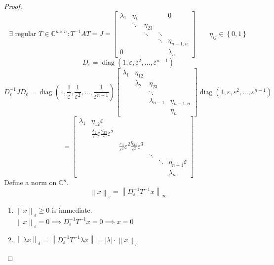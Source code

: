 \documentclass{article}
\numberwithin{lecref}{section}
\newcommand{\set}[1]{\left\{#1\right\}}
\newcommand{\norm}[1]{\left\|#1\right\|}
\newcommand{\card}[1]{\left|#1\right|}
\begin{document}
\begin{proof}
  \[ \exists \text{ regular } T \in \mathbb C^{n \times n}: T^{-1} AT = J = \begin{bmatrix} \lambda_1 & \eta_k & & & 0 \\ & \ddots & \eta_{23} & & \\ & & \ddots & \ddots & \\ & & & \ddots & \eta_{n-1,n} \\ 0 & & & & \lambda_n \end{bmatrix} \qquad \eta_{ij} \in \set{0,1} \]
  \[ D_{\varepsilon} = \operatorname{diag}(1, \varepsilon, \varepsilon^2, \dots, \varepsilon^{n-1}) \]
  \[
    D_{\varepsilon}^{-1} J D_{\varepsilon}
      = \operatorname{diag}(1, \frac1\varepsilon, \frac1{\varepsilon^2}, \dots, \frac{1}{\varepsilon^{n-1}})
      \begin{bmatrix} \lambda_1 & \eta_{12} & & \\ & \lambda_2 & \eta_{23} & \\ & & \ddots & \\ & & \lambda_{n-1} & \eta_{n-1,n} \\ & & & \eta_{n} \end{bmatrix}
      \operatorname{diag}(1, \varepsilon, \varepsilon^2, \dots, \varepsilon^{n-1})
  \] \[
      = \begin{bmatrix}
        \lambda_1 & \eta_{12} \varepsilon & & & & \\
          & \frac{\lambda_2}{\varepsilon} \varepsilon \frac{\eta_{23}}{\varepsilon} \varepsilon^2  & & & & \\
          & & \frac{\varepsilon_{3}}{\varepsilon^2} \varepsilon^2 \frac{\eta_{34}}{\varepsilon^2} \varepsilon^3 & & & \\
          & & & \ddots & & \\
          & & & & \ddots & \eta_{n-1} \varepsilon \\
          & & & & & \lambda_n
      \end{bmatrix}
  \]
  Define a norm on $\mathbb C^n$.
  \[ \norm{x}_{\varepsilon} = \norm{D_{\varepsilon}^{-1} T^{-1} x}_{\infty} \]
  \begin{enumerate}
    \item $\norm{x}_{\varepsilon} \geq 0$ is immediate. \\
      $\norm{x}_{\varepsilon} = 0 \implies D_{\varepsilon}^{-1} T^{-1} x = 0 \implies x = 0$
    \item $\norm{\lambda x}_{\varepsilon} = \norm{D_{\varepsilon}^{-1} T^{-1} \lambda x} = \card{\lambda} \cdot \norm{x}_{\varepsilon}$

\end{enumerate}
\end{proof}
\end{document}
